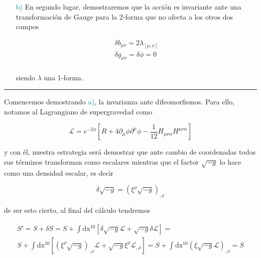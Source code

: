 \documentclass{article}
\numberwithin{equation}{section}
\begin{document}
\begin{itemize}
	\item[\large{\textcolor{teal}{ b)}}] En segundo lugar, demostraremos que la acción es invariante ante una transformación de Gauge para la 2-forma que no afecta a los otros dos campos
	
	\begin{equation}\label{gauge}
	\begin{aligned}
	\delta b_{\mu \nu} = 2 \lambda_{\left[\mu , \nu\right]}
	\\
	\delta g_{\mu \nu} = \delta \phi = 0\\
	\end{aligned}
	\end{equation}
	
	siendo $ \lambda $ una 1-forma.
\end{itemize}

\begin{center}
\rule{0.5\textwidth}{0.4pt}
\end{center}

\vspace{0.4cm}


Comencemos demostrando \textcolor{teal}{ \large{a)}}, la invarianza ante difeomorfismos. Para ello, notamos al Lagrangiano de supergravedad como

\begin{equation}\label{L}
\mathscr{L}= e^{-2\phi}\left[R + 4 \partial_{\mu}\phi\partial^{\mu} \phi - \frac{1}{12} H_{\mu \nu \alpha}H^{\mu \nu \alpha}\right]
\end{equation}

y con él, nuestra estrategia será demostrar que ante cambio de coordenadas todos sus términos transforman como escalares mientras que el factor $\sqrt{-g} $ lo hace como una densidad escalar, es decir

\begin{equation}\label{densidad}
\delta \sqrt{-g} = \left(\xi^{\rho} \sqrt{-g}\right)_{, \rho}
\end{equation}

de ser esto cierto, al final del cálculo tendremos

\begin{equation}\label{tegia}
\begin{aligned}
S' = S + \delta S = S + \int\mathrm{dx^{10}} \left[ \delta \sqrt{-g} \mathscr{L} + \sqrt{-g} \delta \mathscr{L} \right] =\\
S + \int\mathrm{dx^{10}} \left[ \left(\xi^{\rho} \sqrt{-g}\right)_{, \rho} \mathscr{L} + \sqrt{-g} \xi^{\rho}\mathscr{L}_{,\rho} \right] = S + \int\mathrm{dx^{10}} \left( \xi \sqrt{-g} \mathscr{L} \right)_{,\rho} = S
\end{aligned}
\end{equation} 
\end{document}
